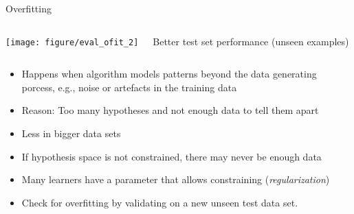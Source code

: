 \documentclass[11pt,compress,t,notes=noshow, xcolor=table]{beamer}
\newenvironment{knitrout}{}{} %
\begin{document}
\begin{vbframe}{Overfitting}
\begin{columns}[T,onlytextwidth]
\begin{knitrout}
{\centering \texttt{[image: figure/eval\_ofit\_2]} 

}



\end{knitrout}
Better test set performance (unseen examples)
\end{columns}


\framebreak


\begin{itemize}
  \item Happens when algorithm models patterns beyond the data generating porcess,
    e.g., noise or artefacts in the training data
  \item Reason: Too many hypotheses and not enough data to tell them apart
  \item Less in bigger data sets
  \item If hypothesis space is not constrained, there may never be enough data
  \item Many learners have a parameter that allows constraining (\textit{regularization})
  \item Check for overfitting by validating on a new unseen test data set.
\end{itemize}

\end{vbframe}


\end{document}
